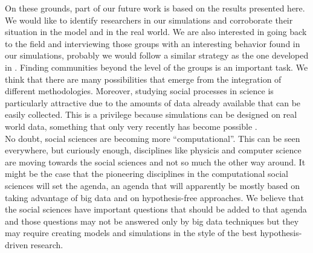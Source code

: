 \documentclass[11pt]{article}
\begin{document}
{{\color{red}On these grounds, part of our future work is based on
  the results presented here. We would like to identify researchers
  in our simulations and corroborate their situation in the model and
  in the real world. We are also interested in going back to the field
  and interviewing those groups with an interesting behavior found in
  our simulations, probably we would follow a similar strategy as the
  one developed in \cite{Haraetal2003}. Finding communities beyond the
  level of the groups is an important task. We think that there are
  many possibilities that emerge from the integration of different
  methodologies. Moreover, studying social processes in science is
  particularly attractive due to the amounts of data already available
  that can be easily collected. This is a privilege because
  simulations can be designed on real world data, something that only
  very recently has become possible \cite{Barabasi2011}.\\


No doubt, social sciences are becoming more ``computational''. This can
be seen everywhere, but curiously enough, disciplines like physicis
and computer science are moving towards the social
sciences and not so much the other way around. It might be the case
that the pioneering disciplines in the computational social sciences
will set the agenda, an agenda that will apparently be mostly based on
taking advantage of big data and on hypothesis-free approaches. We
believe that the social sciences have important questions that should
be added to that agenda and those questions may not be answered only
by big data techniques but they may require creating models and
simulations in the style of the best hypothesis-driven research.}
 

}
\end{document}
